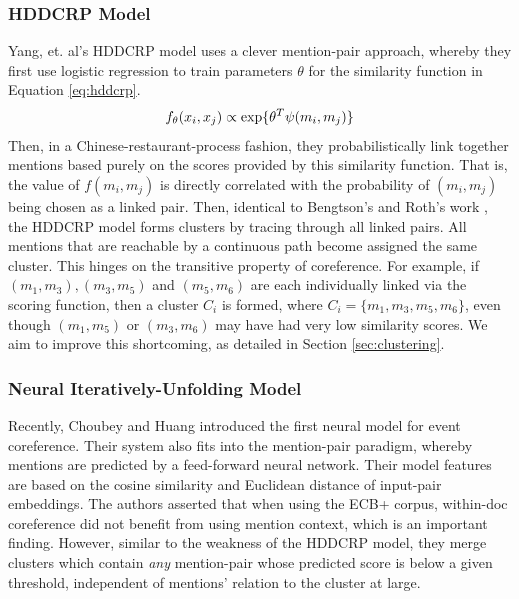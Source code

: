 \documentclass[11pt,a4paper]{article}
\begin{document}
\subsubsection{HDDCRP Model}
\label{sec:HDDCRP}
Yang, et. al's HDDCRP model  uses a clever mention-pair approach, whereby they first use logistic regression to train parameters $\theta$ for the similarity function in Equation \ref{eq:hddcrp}.  
\begin{equation}
\label{eq:hddcrp}
f_{\theta}(x_i,x_j) \propto \textnormal{exp\{} \theta^T\psi(m_i,m_j)\textnormal{\}}
\end{equation}
Then, in a Chinese-restaurant-process fashion, they probabilistically link together mentions based purely on the scores provided by this similarity function.  That is, the value of $f(m_i,m_j)$ is directly correlated with the probability of $(m_i,m_j)$ being chosen as a linked pair.  Then, identical to Bengtson's and Roth's work , the HDDCRP model forms clusters by tracing through all linked pairs. All mentions that are reachable by a continuous path become assigned the same cluster.  This hinges on the transitive property of coreference.  For example, if ${(m_1,m_3),(m_3,m_5)}$ and $(m_5,m_6)$ are each individually linked via the scoring function, then a cluster $C_i$ is formed, where $C_i = \{m_1,m_3,m_5,m_6\}$, even though $(m_1,m_5)$ or $(m_3,m_6)$ may have had very low similarity scores. We aim to improve this shortcoming, as detailed in Section \ref{sec:clustering}.

\subsubsection{Neural Iteratively-Unfolding Model}
\label{sec:Choubey}
Recently, Choubey and Huang  introduced the first neural model for event coreference.  Their system also fits into the mention-pair paradigm, whereby mentions are predicted by a feed-forward neural network. Their model features are based on the cosine similarity and Euclidean distance of input-pair embeddings.  The authors asserted that when using the ECB+ corpus, within-doc coreference did not benefit from using mention context, which is an important finding.  However, similar to the weakness of the HDDCRP model, they merge clusters which contain \textit{any} mention-pair whose predicted score is below a given threshold, independent of mentions' relation to the cluster at large.
\end{document}
